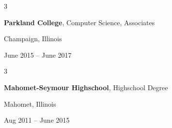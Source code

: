 \documentclass[10pt, letterpaper]{article}
\newenvironment{threecolentry}[3][]{
    \onecolentry
    \def\thirdColumn{#3}
    \setcolumnwidth{1 cm, \fill, 4.5 cm}
    \begin{paracol}{3}
    {\raggedright #2} \switchcolumn
}{
    \switchcolumn \raggedleft \thirdColumn
    \end{paracol}
    \endonecolentry
} %
\begin{document}
        \vspace{0.2 cm}

        \begin{threecolentry}{\textbf{}}{
            Champaign, Illinois

        June 2015 – June 2017
        }
            \textbf{Parkland College}, Computer Science, Associates
        \end{threecolentry}

        \vspace{0.2 cm}

        \begin{threecolentry}{\textbf{}}{
            Mahomet, Illinois

        Aug 2011 – June 2015
        }
            \textbf{Mahomet-Seymour Highschool}, Highschool Degree
        \end{threecolentry}


    
\end{document}
